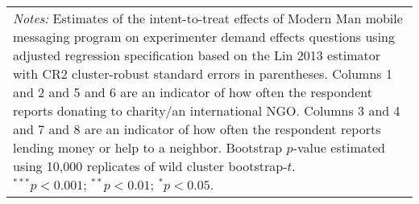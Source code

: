 \begin{tabular}{l c c c c c c c c}
\bottomrule
\multicolumn{9}{l}{\scriptsize{\parbox{\linewidth}{\vspace{2pt} 
       \textit{Notes:} Estimates of the intent-to-treat effects of Modern Man mobile 
       messaging program on experimenter demand effects questions using adjusted regression 
       specification based on the Lin 2013 estimator with CR2 cluster-robust
       standard errors in parentheses. Columns 1 and 2 and 5 and 6 are an indicator of how often the
       respondent reports donating to charity/an international NGO. Columns 3 and 4 and 7 and 8 are 
       an indicator of how often the respondent reports lending money or help to a neighbor.
       Bootstrap $p$-value estimated using 10,000 replicates of wild cluster bootstrap-$t$. \\ $^{***}p<0.001$; $^{**}p<0.01$; $^{*}p<0.05$.}}}
\end{tabular}
